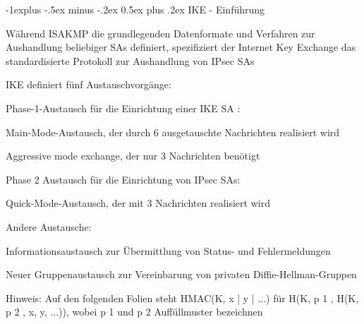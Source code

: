 \documentclass[a4paper]{article}
\makeatletter
\renewcommand{\subsection}{\@startsection{subsection}{2}{0mm}%
 {-1explus -.5ex minus -.2ex}%
 {0.5ex plus .2ex}%
 {\normalfont\normalsize\bfseries}}
\makeatother
\begin{document}
\begin{multicols}{3}
\begin{itemize*}
            \subsection{IKE - Einführung}
            \begin{itemize*}
                  \item       Während ISAKMP die grundlegenden Datenformate und Verfahren zur
                  Aushandlung beliebiger SAs definiert, spezifiziert der Internet Key
                  Exchange das standardisierte Protokoll zur Aushandlung von IPsec SAs
                  \item       IKE definiert fünf Austauschvorgänge:
                  \begin{itemize*}
                        \item Phase-1-Austausch für die Einrichtung einer IKE SA :
                        \begin{itemize*} \item Main-Mode-Austausch, der durch 6 ausgetauschte Nachrichten realisiert wird \item Aggressive mode exchange, der nur 3 Nachrichten benötigt \end{itemize*}
                        \item Phase 2 Austausch für die Einrichtung von IPsec SAs:
                        \begin{itemize*} \item Quick-Mode-Austausch, der mit 3 Nachrichten realisiert wird \end{itemize*}
                        \item Andere Austausche:
                        \begin{itemize*} \item Informationsaustausch zur Übermittlung von Status- und Fehlermeldungen \item Neuer Gruppenaustausch zur Vereinbarung von privaten Diffie-Hellman-Gruppen \end{itemize*}
                  \end{itemize*}
                  \item       Hinweis: Auf den folgenden Folien steht HMAC(K, x | y
                  | ...) für H(K, p 1 , H(K, p 2 , x, y, ...)), wobei p 1 und p
                  2 Auffüllmuster bezeichnen
            \end{itemize*}


\end{itemize*}
\end{multicols}
\end{document}
